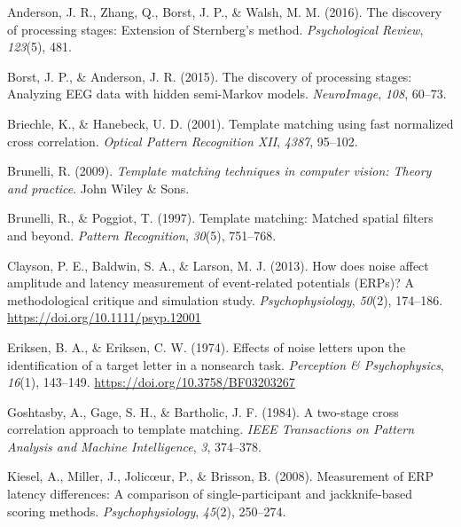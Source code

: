 \documentclass[
  man,floatsintext]{apa7}
\newlength{\cslhangindent}
\newlength{\cslentryspacingunit} %
\newenvironment{CSLReferences}[2] %
 {%
  \setlength{\parindent}{0pt}
  \ifodd #1
  \let\oldpar\par
  \def\par{\hangindent=\cslhangindent\oldpar}
  \fi
  \setlength{\parskip}{#2\cslentryspacingunit}
 }%
 {}
\begin{document}
\hypertarget{refs}{}
\begin{CSLReferences}{1}{0}
\leavevmode{}%
Anderson, J. R., Zhang, Q., Borst, J. P., \& Walsh, M. M. (2016). The discovery of processing stages: {Extension} of {Sternberg}'s method. \emph{Psychological Review}, \emph{123}(5), 481.

\leavevmode{}%
Borst, J. P., \& Anderson, J. R. (2015). The discovery of processing stages: {Analyzing} {EEG} data with hidden semi-{Markov} models. \emph{NeuroImage}, \emph{108}, 60--73.

\leavevmode{}%
Briechle, K., \& Hanebeck, U. D. (2001). Template matching using fast normalized cross correlation. \emph{Optical Pattern Recognition {XII}}, \emph{4387}, 95--102.

\leavevmode{}%
Brunelli, R. (2009). \emph{Template matching techniques in computer vision: Theory and practice}. John Wiley \& Sons.

\leavevmode{}%
Brunelli, R., \& Poggiot, T. (1997). Template matching: {Matched} spatial filters and beyond. \emph{Pattern Recognition}, \emph{30}(5), 751--768.

\leavevmode{}%
Clayson, P. E., Baldwin, S. A., \& Larson, M. J. (2013). How does noise affect amplitude and latency measurement of event-related potentials ({ERPs})? {A} methodological critique and simulation study. \emph{Psychophysiology}, \emph{50}(2), 174--186. \url{https://doi.org/10.1111/psyp.12001}

\leavevmode{}%
Eriksen, B. A., \& Eriksen, C. W. (1974). Effects of noise letters upon the identification of a target letter in a nonsearch task. \emph{Perception \& Psychophysics}, \emph{16}(1), 143--149. \url{https://doi.org/10.3758/BF03203267}

\leavevmode{}%
Goshtasby, A., Gage, S. H., \& Bartholic, J. F. (1984). A two-stage cross correlation approach to template matching. \emph{IEEE Transactions on Pattern Analysis and Machine Intelligence}, \emph{3}, 374--378.

\leavevmode{}%
Kiesel, A., Miller, J., Jolicœur, P., \& Brisson, B. (2008). Measurement of {ERP} latency differences: {A} comparison of single-participant and jackknife-based scoring methods. \emph{Psychophysiology}, \emph{45}(2), 250--274.


\end{CSLReferences}
\end{document}
